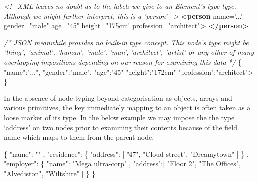 \documentclass[12pt, ]{article}
\newenvironment{Shaded}{}{}
\newcommand{\KeywordTok}[1]{\textcolor[rgb]{0.00,0.44,0.13}{\textbf{{#1}}}}
\newcommand{\StringTok}[1]{\textcolor[rgb]{0.25,0.44,0.63}{{#1}}}
\newcommand{\CommentTok}[1]{\textcolor[rgb]{0.38,0.63,0.69}{\textit{{#1}}}}
\newcommand{\OtherTok}[1]{\textcolor[rgb]{0.00,0.44,0.13}{{#1}}}
\newcommand{\NormalTok}[1]{{#1}}
\begin{document}
\begin{Shaded}
\begin{Highlighting}[]
\CommentTok{<!--  }
\CommentTok{  XML leaves no doubt as to the labels we give to an Element's type }
\CommentTok{  type. Although we might further interpret, this is a 'person'}
\CommentTok{-->}
\KeywordTok{<person}\OtherTok{  name=}\StringTok{'...'}\OtherTok{ gender=}\StringTok{"male"}
\OtherTok{         age=}\StringTok{"45"}\OtherTok{ height=}\StringTok{"175cm"}\OtherTok{ profession=}\StringTok{"architect"}\KeywordTok{>}
\KeywordTok{</person>}
\end{Highlighting}
\end{Shaded}

\begin{Shaded}
\begin{Highlighting}[]
\CommentTok{/* JSON meanwhile provides no built-in type concept. }
\CommentTok{   This node's type might be 'thing', 'animal', 'human', 'male',}
\CommentTok{   'man', 'architect', 'artist' or any other of many overlapping}
\CommentTok{   impositions depending on our reason for examining this data}
\CommentTok{*/}
\NormalTok{\{  }\StringTok{"name"}\NormalTok{:}\StringTok{"..."}\NormalTok{, }\StringTok{"gender"}\NormalTok{:}\StringTok{"male"}\NormalTok{, }\StringTok{"age"}\NormalTok{:}\StringTok{"45"} 
   \StringTok{"height"}\NormalTok{:}\StringTok{"172cm"} \StringTok{"profession"}\NormalTok{:}\StringTok{"architect"}\NormalTok{>}
\NormalTok{\}         }
\end{Highlighting}
\end{Shaded}

In the absence of node typing beyond categorisation as objects, arrays
and various primitives, the key immediately mapping to an object is
often taken as a loose marker of its type. In the below example we may
impose the the type `address' on two nodes prior to examining their
contents because of the field name which maps to them from the parent
node.

\begin{Shaded}
\begin{Highlighting}[]
\NormalTok{\{}
   \StringTok{"name"}\NormalTok{: }\StringTok{""}
\NormalTok{,  }\StringTok{"residence"}\NormalTok{: \{}
      \StringTok{"address"}\NormalTok{: [}
         \StringTok{"47"}\NormalTok{, }\StringTok{"Cloud street"}\NormalTok{, }\StringTok{"Dreamytown"}
      \NormalTok{]}
   \NormalTok{\}}
\NormalTok{,  }\StringTok{"employer"}\NormalTok{: \{}
      \StringTok{"name"}\NormalTok{: }\StringTok{"Mega ultra-corp"}
   \NormalTok{,  }\StringTok{"address"}\NormalTok{:[}
         \StringTok{"Floor 2"}\NormalTok{, }\StringTok{"The Offices"}\NormalTok{, }\StringTok{"Alvediston"}\NormalTok{, }\StringTok{"Wiltshire"}      
      \NormalTok{]}
   \NormalTok{\}   }
\NormalTok{\}}
\end{Highlighting}
\end{Shaded}
\end{document}
